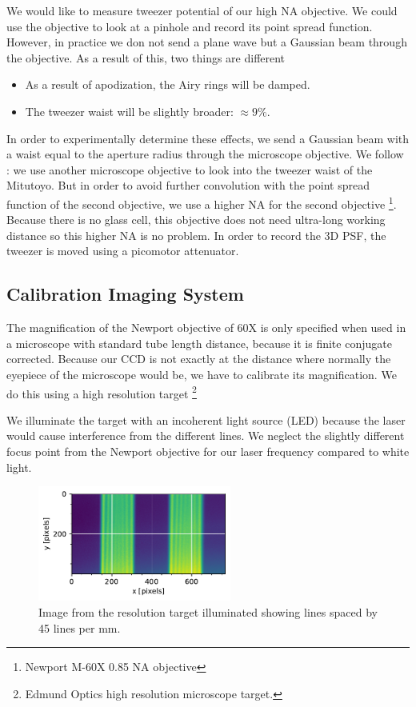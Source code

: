 We would like to measure tweezer potential of our high NA objective. We could use the objective to look at a pinhole and record its point spread function. However, in practice we don not send a plane wave but a Gaussian beam through the objective. As a result of this, two things are different \cite{Sortais2007}

\begin{itemize}
    \item As a result of apodization, the Airy rings will be damped. 
    \item The tweezer waist will be slightly broader: $\approx 9\%$.
\end{itemize}

In order to experimentally determine these effects, we send a Gaussian beam with a waist equal to the aperture radius through the microscope objective. We follow \cite{Baumgaertner2017}: we use another microscope objective to look into the tweezer waist of the Mitutoyo. But in order to avoid further convolution with the point spread function of the second objective, we use a higher NA for the second objective \footnote{Newport M-60X 0.85 NA objective}. Because there is no glass cell, this objective does not need ultra-long working distance so this higher NA is no problem. In order to record the 3D PSF, the tweezer is moved using a picomotor attenuator. 

\subsection{Calibration Imaging System}

The magnification of the Newport objective of 60X is only specified when used in a microscope with standard tube length distance, because it is finite conjugate corrected. Because our CCD is not exactly at the distance where normally the eyepiece of the microscope would be, we have to calibrate its magnification. We do this using a high resolution target \footnote{Edmund Optics high resolution microscope target.} 

We illuminate the target with an incoherent light source (LED) because the laser would cause interference from the different lines. We neglect the slightly different focus point from the Newport objective for our laser frequency compared to white light. 

\begin{figure}
    \centering
    \includegraphics[width = 2.5in]{figures/linespacing.pdf}
    \caption{Image from the resolution target illuminated showing lines spaced by 45 lines per mm.}
    \label{fig:resolutionTarget}
\end{figure}


